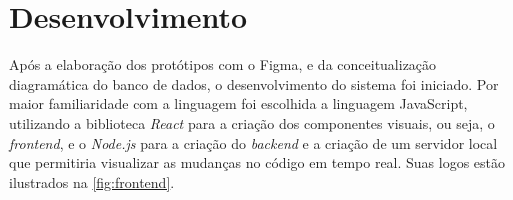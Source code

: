 \section{Desenvolvimento} %



Após a elaboração dos protótipos com o Figma, e da conceitualização diagramática do banco de dados, o desenvolvimento do sistema foi iniciado. Por maior familiaridade com a linguagem foi escolhida a linguagem JavaScript, utilizando a biblioteca \textit{React} para a criação dos componentes visuais, ou seja, o \textit{frontend}, e o \textit{Node.js} para a criação do \textit{backend} e a criação de um servidor local que permitiria visualizar as mudanças no código em tempo real. Suas logos estão ilustrados na \autoref{fig:frontend}.

